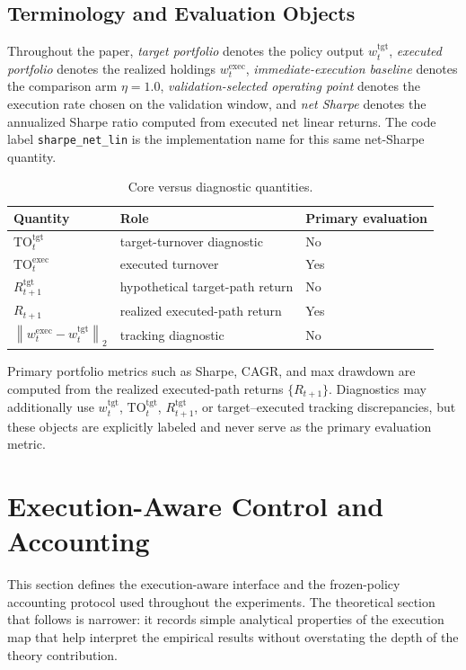 \documentclass[10pt,twocolumn]{article}
\newcommand{\wexec}{w^{\mathrm{exec}}}
\newcommand{\wtgt}{w^{\mathrm{tgt}}}
\newcommand{\TOexec}{\mathrm{TO}^{\mathrm{exec}}}
\newcommand{\TOtgt}{\mathrm{TO}^{\mathrm{tgt}}}
\newcommand{\normtwo}[1]{\left\lVert #1 \right\rVert_2}
\begin{document}
\subsection{Terminology and Evaluation Objects}
Throughout the paper, \emph{target portfolio} denotes the policy output $\wtgt_t$, \emph{executed portfolio} denotes the realized holdings $\wexec_t$, \emph{immediate-execution baseline} denotes the comparison arm $\eta=1.0$, \emph{validation-selected operating point} denotes the execution rate chosen on the validation window, and \emph{net Sharpe} denotes the annualized Sharpe ratio computed from executed net linear returns. The code label \texttt{sharpe\_net\_lin} is the implementation name for this same net-Sharpe quantity.



\begin{table}[H]
\centering
\scriptsize
\caption{Core versus diagnostic quantities.}
\label{tab:core_vs_diag}
\begin{tabular}{@{}lll@{}}
\toprule
Quantity & Role & Primary evaluation \\
\midrule
$\TOtgt_t$ & target-turnover diagnostic & No \\
$\TOexec_t$ & executed turnover & Yes \\
$R^{\mathrm{tgt}}_{t+1}$ & hypothetical target-path return & No \\
$R_{t+1}$ & realized executed-path return & Yes \\
$\normtwo{\wexec_t-\wtgt_t}$ & tracking diagnostic & No \\
\bottomrule
\end{tabular}
\end{table}

Primary portfolio metrics such as Sharpe, CAGR, and max drawdown are computed from the realized executed-path returns $\{R_{t+1}\}$. Diagnostics may additionally use $\wtgt_t$, $\TOtgt_t$, $R^{\mathrm{tgt}}_{t+1}$, or target--executed tracking discrepancies, but these objects are explicitly labeled and never serve as the primary evaluation metric.

\section{Execution-Aware Control and Accounting}
This section defines the execution-aware interface and the frozen-policy accounting protocol used throughout the experiments. The theoretical section that follows is narrower: it records simple analytical properties of the execution map that help interpret the empirical results without overstating the depth of the theory contribution.
\end{document}
